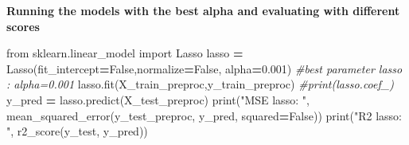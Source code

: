 \documentclass[10pt,a4paper]{article}
\newenvironment{Shaded}{\begin{snugshade}}{\end{snugshade}}
\newcommand{\BuiltInTok}[1]{#1}
\newcommand{\CommentTok}[1]{\textcolor[rgb]{0.56,0.35,0.01}{\textit{#1}}}
\newcommand{\DecValTok}[1]{\textcolor[rgb]{0.00,0.00,0.81}{#1}}
\newcommand{\FloatTok}[1]{\textcolor[rgb]{0.00,0.00,0.81}{#1}}
\newcommand{\ImportTok}[1]{#1}
\newcommand{\NormalTok}[1]{#1}
\newcommand{\OperatorTok}[1]{\textcolor[rgb]{0.81,0.36,0.00}{\textbf{#1}}}
\newcommand{\StringTok}[1]{\textcolor[rgb]{0.31,0.60,0.02}{#1}}
\newcommand{\VariableTok}[1]{\textcolor[rgb]{0.00,0.00,0.00}{#1}}
\theoremstyle{break}
\begin{document}
\begin{Shaded}
\end{Shaded}

\textbf{Running the models with the best alpha and evaluating with different scores}

\begin{Shaded}
\begin{Highlighting}[]
\ImportTok{from}\NormalTok{ sklearn.linear_model }\ImportTok{import}\NormalTok{ Lasso}
\NormalTok{lasso }\OperatorTok{=}\NormalTok{ Lasso(fit_intercept}\OperatorTok{=}\VariableTok{False}\NormalTok{,normalize}\OperatorTok{=}\VariableTok{False}\NormalTok{, alpha}\OperatorTok{=}\FloatTok{0.001}\NormalTok{) }\CommentTok{#best parameter lasso : alpha=0.001}
\NormalTok{lasso.fit(X_train_preproc,y_train_preproc)}
\CommentTok{#print(lasso.coef_)}
\NormalTok{y_pred }\OperatorTok{=}\NormalTok{ lasso.predict(X_test_preproc)}
\BuiltInTok{print}\NormalTok{(}\StringTok{"MSE lasso: "}\NormalTok{, mean_squared_error(y_test_preproc, y_pred, squared}\OperatorTok{=}\VariableTok{False}\NormalTok{))}
\BuiltInTok{print}\NormalTok{(}\StringTok{"R2 lasso: "}\NormalTok{, r2_score(y_test, y_pred))}
\end{Highlighting}
\end{Shaded}
\end{document}
